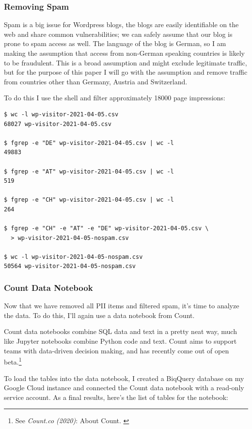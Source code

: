 \subsubsection{Removing Spam}

Spam is a big issue for Wordpress blogs, the blogs are easily identifiable on the web and share common vulnerabilities; we can safely assume that our blog is prone to spam access as well. The language of the blog is German, so I am making the assumption that access from non-German speaking countries is likely to be fraudulent. This is a broad assumption and might exclude legitimate traffic, but for the purpose of this paper I will go with the assumption and remove traffic from countries other than Germany, Austria and Switzerland. 

To do this I use the shell and filter approximately 18000 page impressions:

\begin{lstlisting}[caption=Removing Spam, frame=single, basicstyle=\ttfamily]
$ wc -l wp-visitor-2021-04-05.csv
68027 wp-visitor-2021-04-05.csv

$ fgrep -e "DE" wp-visitor-2021-04-05.csv | wc -l
49883

$ fgrep -e "AT" wp-visitor-2021-04-05.csv | wc -l
519

$ fgrep -e "CH" wp-visitor-2021-04-05.csv | wc -l
264

$ fgrep -e "CH" -e "AT" -e "DE" wp-visitor-2021-04-05.csv \
  > wp-visitor-2021-04-05-nospam.csv

$ wc -l wp-visitor-2021-04-05-nospam.csv 
50564 wp-visitor-2021-04-05-nospam.csv
\end{lstlisting}

\subsubsection{Count Data Notebook}

Now that we have removed all PII items and filtered spam, it's time to analyze the data. To do this, I'll again use a data notebook from Count.

Count data notebooks combine SQL data and text in a pretty neat way, much like Jupyter notebooks combine Python code and text. Count aims to support teams with data-driven decision making, and has recently come out of open beta.\footnote{See \textit{Count.co (2020)}: About Count. \cite{aboutCount}}

To load the tables into the data notebook, I created a BiqQuery database on my Google Cloud instance and connected the Count data notebook with a read-only service account. As a final results, here's the list of tables for the notebook:

